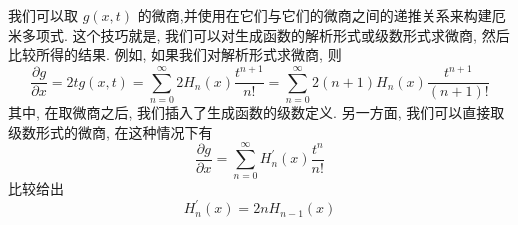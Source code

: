 \documentclass[lang=cn,newtx,10pt,scheme=chinese,thmcnt=section]{elegantbook}
\begin{document}
我们可以取 $g\left( {x, t}\right)$ 的微商,并使用在它们与它们的微商之间的递推关系来构建厄米多项式. 这个技巧就是, 我们可以对生成函数的解析形式或级数形式求微商, 然后比较所得的结果. 例如, 如果我们对解析形式求微商, 则
\begin{equation}
	\frac{\partial g}{\partial x} = {2tg}\left( {x, t}\right) = \mathop{\sum }\limits_{{n = 0}}^{\infty }2{H}_{n}\left( x\right) \frac{{t}^{n + 1}}{n!} = \mathop{\sum }\limits_{{n = 0}}^{\infty }2\left( {n + 1}\right) {H}_{n}\left( x\right) \frac{{t}^{n + 1}}{\left( {n + 1}\right) !}
\end{equation}
其中, 在取微商之后, 我们插入了生成函数的级数定义. 另一方面, 我们可以直接取级数形式的微商, 在这种情况下有
\begin{equation}
	\frac{\partial g}{\partial x} = \mathop{\sum }\limits_{{n = 0}}^{\infty }{H}_{n}^{\prime }\left( x\right) \frac{{t}^{n}}{n!}
\end{equation}
比较给出
\begin{equation}
	{H}_{n}^{\prime }\left( x\right) = {2n}{H}_{n - 1}\left( x\right)
\end{equation}
\end{document}
